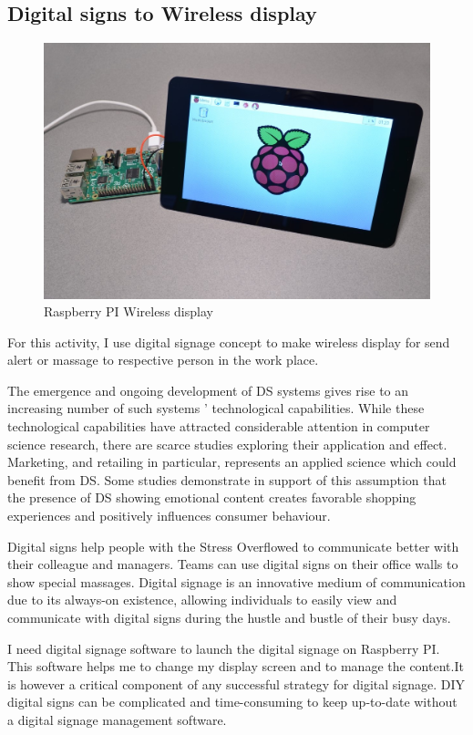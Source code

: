 \subsection{Digital signs to Wireless display}
\begin{figure}[hbt!] 
  \centering
  \includegraphics[width=0.5\linewidth]{chap4/image4/dipl.jpg}
  \caption[Raspberry PI Wireless display ]{Raspberry PI Wireless display}
  \label{fig:PI_disp}
\end{figure}
For this activity, I use digital signage concept to make wireless display for send alert or massage to respective person in the work place.

The emergence and ongoing development of \acf{DS} systems gives rise to an increasing number of such systems ' technological capabilities. While these technological capabilities have attracted considerable attention in computer science research, there are scarce studies exploring their application and effect.  Marketing, and retailing in particular, represents an applied science which could benefit from \acf{DS}.  Some studies demonstrate in support of this assumption that the presence of \acs{DS} showing emotional content creates favorable shopping experiences and positively influences consumer behaviour.\citep{Bauer2018ResearchRetail}

Digital signs help people with the Stress Overflowed to communicate better with their colleague and managers. Teams can use digital signs on their office walls to show special massages. Digital signage is an innovative medium of communication due to its always-on existence, allowing individuals to easily view and communicate with digital signs during the hustle and bustle of their busy days.

I need digital signage software to launch the digital signage on Raspberry PI. This software helps me to change my display screen and to manage the content.It is however a critical component of any successful strategy for digital signage. \acs{DIY} digital signs can be complicated and time-consuming to keep up-to-date without a digital signage management software.

